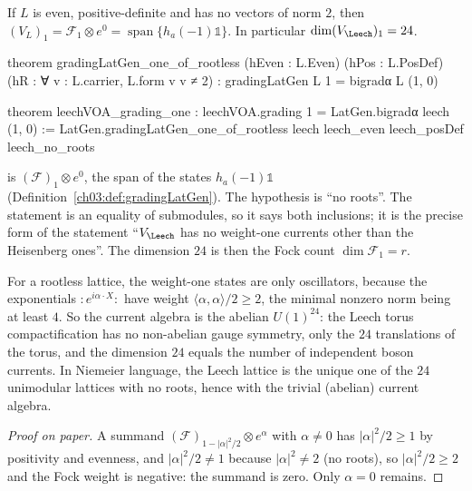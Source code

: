 \begin{theorem}\label{ch03:thm:rootless}
If $L$ is even, positive-definite and has no vectors of norm $2$, then
$(V_L)_1=\mathcal F_1\otimes e^0=\operatorname{span}\{h_a(-1)\mathbb 1\}$. In particular
$\dim(V_\Leech)_1=24$.
\end{theorem}
\begin{leancode}
theorem gradingLatGen_one_of_rootless (hEven : L.Even) (hPos : L.PosDef)
    (hR : ∀ v : L.carrier, L.form v v ≠ 2) :
    gradingLatGen L 1 = bigradα L (1, 0)

theorem leechVOA_grading_one :
    leechVOA.grading 1 = LatGen.bigradα leech (1, 0) :=
  LatGen.gradingLatGen_one_of_rootless leech leech_even leech_posDef leech_no_roots
\end{leancode}

\begin{dictionary}
 is $(\mathcal F)_1\otimes e^0$, the span of the states $h_a(-1)\mathbb 1$
(Definition~\ref{ch03:def:gradingLatGen}). The hypothesis  is ``no roots''. The
statement is an equality of submodules, so it says both inclusions; it is the precise form of the
statement ``$V_\Leech$ has no weight-one currents other than the Heisenberg ones''. The dimension
$24$ is then the Fock count $\dim\mathcal F_1=r$.
\end{dictionary}

\begin{physics}
For a rootless lattice, the weight-one states are only oscillators, because the exponentials $:\!e^{i\alpha\cdot X}\!:$ have weight $\langle\alpha,\alpha\rangle/2\ge2$, the minimal nonzero norm being at least $4$. So the current algebra is the abelian $U(1)^{24}$: the Leech torus compactification has no non-abelian gauge symmetry, only the $24$ translations of the torus, and the dimension $24$ equals the number of independent boson currents. In Niemeier language, the Leech lattice is the unique one of the $24$ unimodular lattices with no roots, hence with the trivial (abelian) current algebra.
\end{physics}

\begin{proof}[Proof on paper]
A summand $(\mathcal F)_{1-|\alpha|^2/2}\otimes e^\alpha$ with $\alpha\neq0$ has
$|\alpha|^2/2\geq1$ by positivity and evenness, and $|\alpha|^2/2\neq1$ because $|\alpha|^2\ne2$
(no roots), so
$|\alpha|^2/2\geq2$ and the Fock weight is negative: the summand is zero. Only $\alpha=0$ remains.
\end{proof}

